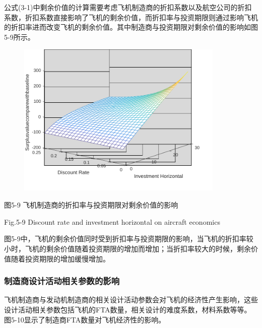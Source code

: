 \documentclass[12pt]{article}
\begin{document}
公式(3-1)中剩余价值的计算需要考虑飞机制造商的折扣系数以及航空公司的折扣系数，折扣系数直接影响了飞机的剩余价值，而折扣率与投资期限则通过影响飞机的折扣率进而改变飞机的剩余价值。其中制造商与投资期限对剩余价值的影响如图5-9所示。\par




\begin{figure}[H]
	\begin{Center}
		\includegraphics[width=3.9in,height=2.93in]{./media512/image6.pdf}
	\end{Center}
\end{figure}



\par

\begin{Center}
图5-9 飞机制造商的折扣率与投资期限对剩余价值的影响
\end{Center}\par

\begin{Center}
Fig.5-9 Discount rate and investment horizontal on aircraft economics
\end{Center}\par


\vspace{\baselineskip}
图5-9中，飞机的剩余价值同时受到折扣率与投资期限的影响，当飞机的折扣率较小时，飞机的剩余价值随着投资期限的增加而增加；当折扣率较大的时候，剩余价值随着投资期限的增加缓慢增加。\par

\subsubsection*{制造商设计活动相关参数的影响}
飞机制造商与发动机制造商的相关设计活动参数会对飞机的经济性产生影响，这些设计活动相关参数包括飞机的FTA数量，相关设计的难度系数，材料系数等等。图5-10显示了制造商FTA数量对飞机经济性的影响。\par
\end{document}
